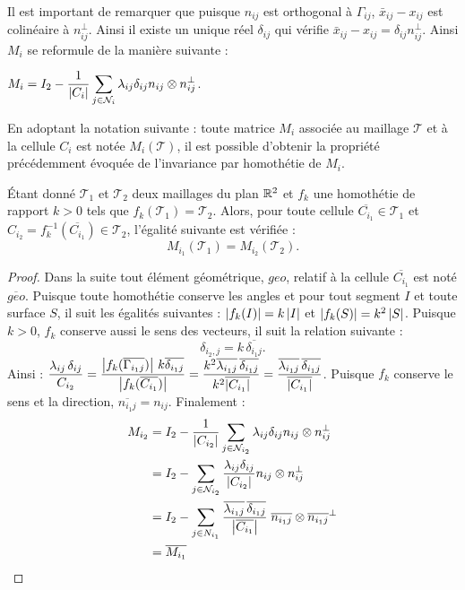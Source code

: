 \documentclass[12pt,a4paper]{article}
\begin{document}
	Il est important de remarquer que puisque $n_{ij}$ est orthogonal à $\Gamma_{ij}$, $\bar x_{ij} - x_{ij}$ est colinéaire à $n_{ij}^\perp$. Ainsi il existe un unique réel $\delta_{ij}$ qui vérifie $\bar x_{ij}-x_{ij} = \delta_{ij}n_{ij}^\perp$.
	\newpage
	Ainsi $M_i$ se reformule de la manière suivante :
	\begin{center}
		$M_i = I_2 - \dfrac1{\left\lvert C_i \right\rvert}\displaystyle\sum_{j \in \mathcal N_i} \lambda_{ij}\delta_{ij} {n_{ij}}\otimes n_{ij}^\perp$.
	\end{center}
	
	En adoptant la notation suivante : toute matrice $M_i$ associée au maillage $\mathcal T$ et à la cellule $C_i$ est notée $M_i(\mathcal T)$, il est possible d'obtenir la propriété précédemment évoquée de l'invariance par homothétie de $M_i$.
	
	\begin{lm}\label{lm:invariance_Mi}
		Étant donné $\mathcal T_1$ et $\mathcal T_2$ deux maillages du plan $\mathbb{R}^2$ et $f_k$ une homothétie de rapport $k > 0$  tels que $f_k(\mathcal T_1)=\mathcal T_2$. Alors, pour toute cellule $\overline{C_{i_1}} \in \mathcal T_1$ et $C_{i_2} = f_k^{-1}(\overline{C_{i_1}}) \in \mathcal T_2$, l'égalité suivante est vérifiée : 
		\[ 
		M_{i_1}(\mathcal T_1) = M_{i_2}(\mathcal T_2).
		\]
		\vspace*{-1cm}
	\end{lm}
	\begin{proof}
		Dans la suite tout élément géométrique, $geo$, relatif à la cellule $\overline{C_{i_1}}$ est noté $\overline{geo}$. Puisque toute homothétie conserve les angles et pour tout segment $I$ et toute surface $S$, il suit les égalités suivantes : $\left\lvert f_k(I) \right\rvert = k\left\lvert I \right\rvert$ et $\left\lvert f_k(S) \right\rvert = k^2\left\lvert S \right\rvert$. Puisque $k > 0$, $f_k$ conserve aussi le sens des vecteurs, il suit la relation suivante :
		\[
				\delta_{i_2,j} = k\,\overline{\delta_{i_1j}}.
		\]
		Ainsi : $\dfrac{\lambda_{ij}\,\delta_{ij}}{C_{i_2}} = \dfrac{\left\lvert f_k(\overline{\Gamma_{i_1j}}) \right\rvert\,k\overline{\delta_{i_1j}}}{\left\lvert f_k(\overline{C_{i_1}}) \right\rvert} = \dfrac{k^2\overline{\lambda_{i_1j}}\,\overline{\delta_{i_1j}}}{k^2\overline{\left\lvert C_{i_1} \right\rvert}} = \dfrac{\overline{\lambda_{i_1j}}\,\overline{\delta_{i_1j}}}{\overline{\left\lvert C_{i_1} \right\rvert}}$. Puisque $f_k$ conserve le sens et la direction, $\overline{n_{i_1j}} = n_{ij}$. Finalement :
		\[\begin{aligned}
			M_{i_2} &= I_2 - \dfrac1{\left\lvert C_{i_2} \right\rvert}\displaystyle\sum_{j \in \mathcal N_{i_2}} \lambda_{ij}\delta_{ij} n_{ij}\otimes n_{ij}^\perp\\
			&= I_2 - \displaystyle\sum_{j \in \mathcal N_{i_2}} \dfrac{\lambda_{ij}\delta_{ij}}{\left\lvert C_{i_2} \right\rvert} n_{ij}\otimes n_{ij}^\perp\\
			&= I_2 - \displaystyle\sum_{j \in \mathcal \overline{N_{i_1}}} \dfrac{\overline{\lambda_{i_1j}}\,\overline{\delta_{i_1j}}}{\left\lvert \overline{C_{i_1}} \right\rvert}\; \overline{n_{i_1j}}\otimes \overline{n_{i_1j}}^\perp\\
			&=\overline{M_{i_1}}
		\end{aligned}\]
	\end{proof}
	
\end{document}
